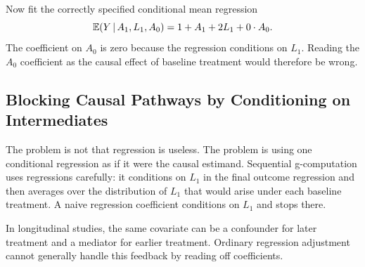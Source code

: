 Now fit the correctly specified conditional mean regression
\[
  \mathbb{E}(Y\,\vert\, A_1,L_1,A_0)=1+A_1+2L_1+0\cdot A_0.
\]
The coefficient on $A_0$ is zero because the regression conditions on $L_1$.
Reading the $A_0$ coefficient as the causal effect of baseline treatment would
therefore be wrong.

\subsection{Blocking Causal Pathways by Conditioning on Intermediates}

The problem is not that regression is useless. The problem is using one
conditional regression as if it were the causal estimand. Sequential
g-computation uses regressions carefully: it conditions on $L_1$ in the final
outcome regression and then averages over the distribution of $L_1$ that would
arise under each baseline treatment. A naive regression coefficient conditions
on $L_1$ and stops there.

\begin{keyidea}
In longitudinal studies, the same covariate can be a confounder for later
treatment and a mediator for earlier treatment. Ordinary regression adjustment
cannot generally handle this feedback by reading off coefficients.
\end{keyidea}
